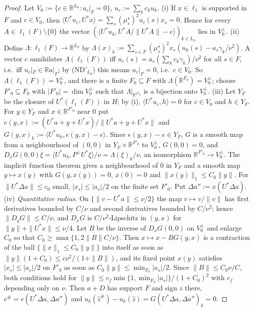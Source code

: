 \documentclass[10pt]{amsart}
\theoremstyle{definition}
\theoremstyle{remark}
\newcommand{\R}{\mathbb R}
\newcommand{\zh}{\hat z}
\newcommand{\ip}[2]{\langle #1,#2\rangle}
\begin{document}
\begin{proof}
Let $V_0:=\{c\in\R^{L_0}:u_c|_F=0\}$, $u_c:=\sum_kc_ku_k$.
(i) If $x\in\ell_1$ is supported in $F$ and $c\in V_0$, then $\ip{U^*u_c}
{U^*x}=\sum_s(\mu^\star_s)^2u_c(s)x_s=0$.  Hence for every $A\in\ell_1(F)
\setminus\{0\}$ the vector $(\ip{U^*u_k}{U^*A/\|U^*A\|-e})_{k\in L_0}$ lies in
$V_0^\perp$.
(ii) Define $\Lambda:\ell_1(F)\to\R^{L_0}$ by $\Lambda(x)_k:=\sum_{s\in F}
(\mu^\star_s)^2x_s(u_k(s)-a_s\gamma_k/\nu^2)$.  A vector $c$ annihilates
$\Lambda(\ell_1(F))$ iff $u_c(s)=a_s(\sum_kc_k\gamma_k)/\nu^2$ for all $s\in F$,
i.e.\ iff $u_c|_F\in\R a|_F$; by (ND$'_{L_0}$) this means $u_c|_F=0$, i.e.\
$c\in V_0$.  So $\Lambda(\ell_1(F))=V_0^\perp$, and there is a finite
$F_0\subseteq F$ with $\Lambda(\R^{F_0})=V_0^\perp$; choose $F'_0\subseteq F_0$
with $|F'_0|=\dim V_0^\perp$ such that $\Lambda|_{\R^{F'_0}}$ is a bijection
onto $V_0^\perp$.
(iii) Let $Y_F$ be the closure of $U^*(\ell_1(F))$ in $H$; by (i),
$\ip{U^*u_c}h=0$ for $c\in V_0$ and $h\in Y_F$.  For $y\in Y_F$ and
$x\in\R^{F'_0}$ near $0$ put $e(y,x):=(U^*a+y+U^*x)/\|U^*a+y+U^*x\|$ and
$G(y,x)_k:=\ip{U^*u_k}{e(y,x)-e}$.  Since $e(y,x)-e\in Y_F$, $G$ is a smooth
map from a neighbourhood of $(0,0)$ in $Y_F\times\R^{F'_0}$ to $V_0^\perp$,
$G(0,0)=0$, and $D_xG(0,0)\xi=\ip{U^*u_k}{P^\perp U^*\xi}/\nu=
\Lambda(\xi)_k/\nu$, an isomorphism $\R^{F'_0}\to V_0^\perp$.  The implicit
function theorem gives a neighbourhood of $0$ in $Y_F$ and a smooth map
$y\mapsto x(y)$ with $G(y,x(y))=0$, $x(0)=0$ and $\|x(y)\|_1\le C_0\|y\|$.
For $\|U^*\Delta a\|\le c_0$ small, $|x_s|\le|a_s|/2$ on the finite set $F'_0$.
Put $\Delta a'':=x(U^*\Delta a)$.
(iv) \emph{Quantitative radius.}  On $\{\|v-U^*a\|\le\nu/2\}$ the map
$v\mapsto v/\|v\|$ has first derivatives bounded by $C/\nu$ and second
derivatives bounded by $C/\nu^2$; hence $\|D_yG\|\le C/\nu$, and $D_xG$ is
$C/\nu^2$-Lipschitz in $(y,x)$ for $\|y\|+\|U^*x\|\le\nu/4$.  Let $B$ be the
inverse of $D_xG(0,0)$ on $V_0^\perp$ and enlarge $C_0$ so that $C_0\ge
\max\{1,2\|B\|C/\nu\}$.  Then $x\mapsto x-BG(y,x)$ is a contraction of the
ball $\{\|x\|_1\le C_0\|y\|\}$ into itself as soon as $\|y\|(1+C_0)\le c\nu^2/
(1+\|B\|)$, and its fixed point $x(y)$ satisfies $|x_s|\le|a_s|/2$ on $F'_0$
as soon as $C_0\|y\|\le\min_{F_0}|a_s|/2$.  Since $\|B\|\le C_0\nu/C$, both
conditions hold for $\|y\|\le c_f\min\{1,\min_{F_0}|a_s|\}/(1+C_0)^2$ with
$c_f$ depending only on $\nu$.  Then $a+D$ has support $F$ and sign $z$
there, $e^\#=e(U^*\Delta a,\Delta a'')$ and $u_k(\zh^\#)-u_k(\zh)=
G(U^*\Delta a,\Delta a'')_k=0$.
\end{proof}
\end{document}
